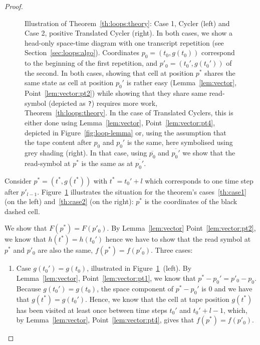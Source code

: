 \begin{proof}
\begin{figure}[h!]
\begin{minipage}[t]{0.5\textwidth}
{
            }
        \end{minipage}
        \caption{Illustration of Theorem~\ref{th:loops:theory}: Case 1, Cycler (left) and Case 2, positive Translated Cycler (right). In both cases, we show a head-only space-time diagram with one transcript repetition (see Section~\ref{sec:loops:algo}). Coordinates $p_0 = (t_0,g(t_0))$ correspond to the beginning of the first repetition, and $p'_0 = (t_0',g(t_0'))$ of the second. In both cases, showing that cell at position $p^*$ shares the same state as cell at position $p_0'$ is rather easy (Lemma~\ref{lem:vector}, Point~\ref{lem:vector:pt2}) while showing that they share same read-symbol (depicted as \texttt{?}) requires more work, Theorem~\ref{th:loops:theory}. In the case of Translated Cyclers, this is either done using Lemma~\ref{lem:vector}, Point~\ref{lem:vector:pt4}, depicted in Figure~\ref{fig:loop-lemma} or, using the assumption that the tape content after $p_0$ and $p_0'$ is the same, here symbolised using grey shading (right). In that case, using $\overline{p_0}$ and $\overline{p_0'}$ we show that the read-symbol at $p^*$ is the same as at $\overline{p_0'}$.}\label{fig:loop-proof}
    \end{figure}

    Consider $p^* = (t^*, g(t^*))$ with $t^*=t_0'+l$ which corresponds to one time step after $p'_{l-1}$. Figure~\ref{fig:loop-proof} illustrates the situation for the theorem's cases~\ref{th:case1} (on the left) and~\ref{th:case2} (on the right): $p^*$ is the coordinates of the black dashed cell.

    We show that $F(p^*) = F(p'_0)$. By Lemma~\ref{lem:vector} Point~\ref{lem:vector:pt2}, we know that $h(t^*) = h(t_0')$ hence we have to show that the read symbol at $p^*$ and $p'_0$ are also the same, \ie $f(p^*) = f(p'_0)$. Three cases:

    \begin{enumerate}
        \item Case $g(t_0') = g(t_0)$, illustrated in Figure~\ref{fig:loop-proof}~(left).  By Lemma~\ref{lem:vector}, Point~\ref{lem:vector:pt1}, we know that $p^*-p_0' = p'_0 - p_0$. Because $g(t_0') = g(t_0)$, the space component of $p^*-p_0'$ is 0 and we have that $g(t^*) = g(t_0')$. Hence, we know that the cell at tape position $g(t^*)$ has been visited at least once between time steps $t_0'$ and $t_0'+l-1$, which, by Lemma~\ref{lem:vector}, Point~\ref{lem:vector:pt4}, gives that $f(p^*) = f(p'_0)$.


\end{enumerate}
\end{proof}
